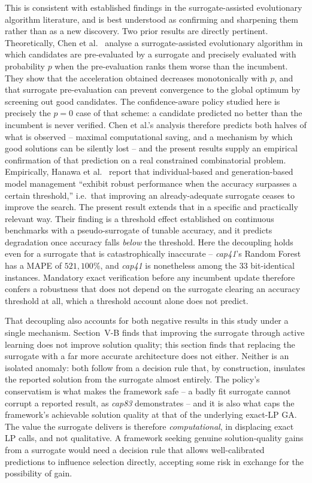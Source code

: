\documentclass[conference]{IEEEtran}
\begin{document}
This is consistent with established findings in the surrogate-assisted
evolutionary algorithm literature, and is best understood as confirming and
sharpening them rather than as a new discovery. Two prior results are directly
pertinent. Theoretically, Chen et al.\ \citep{chen2013} analyse a
surrogate-assisted evolutionary algorithm in which candidates are pre-evaluated
by a surrogate and precisely evaluated with probability $p$ when the
pre-evaluation ranks them worse than the incumbent. They show that the
acceleration obtained decreases monotonically with $p$, and that surrogate
pre-evaluation can prevent convergence to the global optimum by screening out
good candidates. The confidence-aware policy studied here is precisely the
$p = 0$ case of that scheme: a candidate predicted no better than the incumbent
is never verified. Chen et al.'s analysis therefore predicts both halves of what
is observed -- maximal computational saving, and a mechanism by which good
solutions can be silently lost -- and the present results supply an empirical
confirmation of that prediction on a real constrained combinatorial problem.
Empirically, Hanawa et al.\ \citep{hanawa2025} report that individual-based and
generation-based model management ``exhibit robust performance when the accuracy
surpasses a certain threshold,'' i.e.\ that improving an already-adequate
surrogate ceases to improve the search. The present result extends that in a
specific and practically relevant way. Their finding is a threshold effect established on
continuous benchmarks with a pseudo-surrogate of tunable accuracy, and it
predicts degradation once accuracy falls \emph{below} the threshold. Here the
decoupling holds even for a surrogate that is catastrophically inaccurate --
\emph{cap41}'s Random Forest has a MAPE of $521{,}100\%$, and \emph{cap41} is
nonetheless among the 33 bit-identical instances. Mandatory exact verification
before any incumbent update therefore confers a robustness that does not depend
on the surrogate clearing an accuracy threshold at all, which a threshold
account alone does not predict.

That decoupling also accounts for both negative results in this study under a
single mechanism. Section~V-B finds that improving the surrogate through active
learning does not improve solution quality; this section finds that replacing
the surrogate with a far more accurate architecture does not either. Neither is
an isolated anomaly: both follow from a decision rule that, by construction,
insulates the reported solution from the surrogate almost entirely. The
policy's conservatism is what makes the framework safe -- a badly fit surrogate
cannot corrupt a reported result, as \emph{cap83} demonstrates -- and it is
also what caps the framework's achievable solution quality at that of the
underlying exact-LP GA. The value the surrogate delivers is therefore
\emph{computational}, in displacing exact LP calls, and not qualitative. A
framework seeking genuine solution-quality gains from a surrogate would need a
decision rule that allows well-calibrated predictions to influence selection
directly, accepting some risk in exchange for the possibility of gain.
\end{document}

